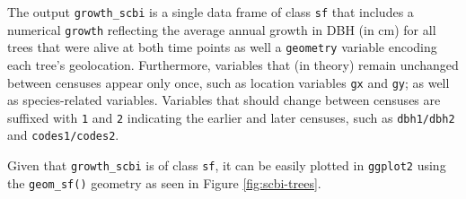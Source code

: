 \documentclass[12pt]{article}
\newenvironment{Shaded}{\begin{snugshade}}{\end{snugshade}}
\newcommand{\CommentTok}[1]{\textcolor[rgb]{0.56,0.35,0.01}{\textit{#1}}}
\newcommand{\DataTypeTok}[1]{\textcolor[rgb]{0.13,0.29,0.53}{#1}}
\newcommand{\DecValTok}[1]{\textcolor[rgb]{0.00,0.00,0.81}{#1}}
\newcommand{\KeywordTok}[1]{\textcolor[rgb]{0.13,0.29,0.53}{\textbf{#1}}}
\newcommand{\NormalTok}[1]{#1}
\newcommand{\OperatorTok}[1]{\textcolor[rgb]{0.81,0.36,0.00}{\textbf{#1}}}
\newcommand{\StringTok}[1]{\textcolor[rgb]{0.31,0.60,0.02}{#1}}
\begin{document}
\begin{Shaded}
\end{Shaded}

The output \texttt{growth\_scbi} is a single data frame of class
\texttt{sf} that includes a numerical \texttt{growth} reflecting the
average annual growth in DBH (in cm) for all trees that were alive at
both time points as well a \texttt{geometry} variable encoding each
tree's geolocation. Furthermore, variables that (in theory) remain
unchanged between censuses appear only once, such as location variables
\texttt{gx} and \texttt{gy}; as well as species-related variables.
Variables that should change between censuses are suffixed with
\texttt{1} and \texttt{2} indicating the earlier and later censuses,
such as \texttt{dbh1/dbh2} and \texttt{codes1/codes2}.

Given that \texttt{growth\_scbi} is of class \texttt{sf}, it can be
easily plotted in \texttt{ggplot2} using the \texttt{geom\_sf()}
geometry as seen in Figure \ref{fig:scbi-trees}.
\end{document}
